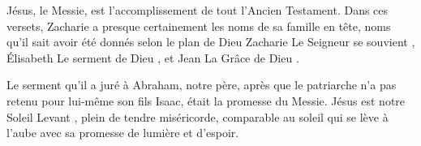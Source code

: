 Jésus, le Messie, est l'accomplissement de tout l'Ancien Testament. Dans ces versets, Zacharie a presque certainement les noms de sa famille en tête, noms qu'il sait avoir été donnés selon le plan de Dieu\frcolon{} Zacharie \ocadr \Og Le Seigneur se souvient \Fg{}, Élisabeth \ocadr \Og Le serment de Dieu \Fg{}, et Jean \ocadr \Og La Grâce de Dieu \Fg{}.

\Og Le serment qu’il a juré à Abraham, notre père, \Fg{} après que le patriarche n'a pas retenu pour lui-même son fils Isaac, était la promesse du Messie. Jésus est notre \Og Soleil Levant \Fg{}, plein de tendre miséricorde, comparable au soleil qui se lève à l'aube avec sa promesse de lumière et d'espoir.


\begin{dvquotes}
\end{dvquotes}

